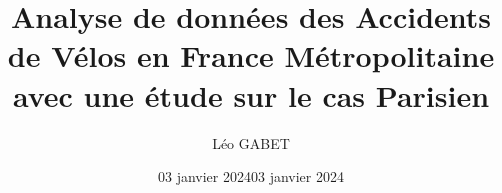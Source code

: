 \documentclass[french,]{compterendu}
\title{Analyse de données des Accidents de Vélos en France Métropolitaine avec une étude sur le cas Parisien}
\author{Léo GABET}
\date{03 janvier 2024}
\date{03 janvier 2024}
\theoremstyle{urcastyle}
\theoremstyle{remark}
\begin{document}

\newtheorem{lemme}{Lemme}[section]
\newtheorem{theoreme}{Théorème}[section]
\newtheorem{corollaire}{Corollaire}[section]
\newtheorem{propriete}{Propriété}[section]
\newtheorem{proprietes}{Propriétés}[section]



\maketitle

% 
% 
\end{document}
